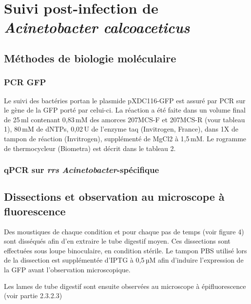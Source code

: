 \section{Suivi post-infection de \textit{Acinetobacter calcoaceticus}}

\subsection{Méthodes de biologie moléculaire}

\subsubsection{PCR GFP}

Le suivi des bactéries portan le plasmide pXDC116-GFP est assuré par PCR sur le gène de la GFP porté par celui-ci.
La réaction a été faite dans un volume final de 25\,ml contenant 0,83\,mM des amorces 207MCS-F et 207MCS-R (vour tableau 1), 80\,mM de dNTPs, 0,02\,U de l'enzyme taq (Invitrogen, France), dans 1X de tampon de réaction (Invitrogen), supplémenté de MgCl2 à 1,5\,mM.
Le rogramme de thermocycleur (Biometra) est décrit dans le tableau 2.

\subsubsection{qPCR sur \textit{rrs} \textit{Acinetobacter}-spécifique}

\subsection{Dissections et observation au microscope à fluorescence}

Des moustiques de chaque condition et pour chaque pas de temps (voir figure 4) sont disséqués afin d'en extraire le tube digestif moyen.
Ces dissections sont effectuées sous loupe binoculaire, en condition stérile.
Le tampon PBS utilisé lors de la dissection est supplémentée d'IPTG à 0,5\,µM afin d'induire l'expression de la GFP avant l'observation microscopique.

Les lames de tube digestif sont ensuite observées au microscope à épifluorescence (voir partie 2.3.2.3)

